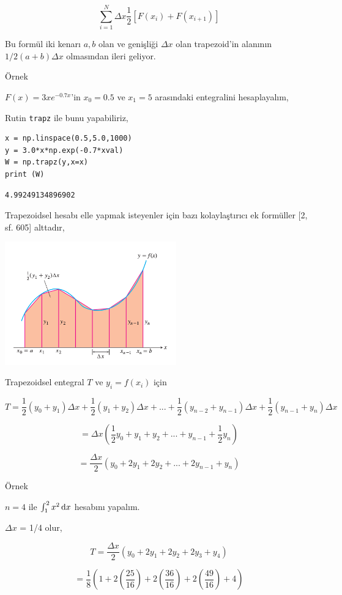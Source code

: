 \documentclass[12pt,fleqn]{article}\usepackage{../../common}
\begin{document}
$$
\sum_{i=1}^{N} \Delta x \frac{1}{2} [F(x_i) + F(x_{i+1})]
$$

Bu formül iki kenarı $a,b$ olan ve genişliği $\Delta x$ olan trapezoid'in
alanının $1/2(a+b)\Delta x$ olmasından ileri geliyor.

Örnek

$F(x) = 3 x e^{-0.7 x}$'in $x_0=0.5$ ve $x_1=5$ arasındaki entegralini
hesaplayalım,

Rutin \verb!trapz! ile bunu yapabiliriz,

\begin{verbatim}
x = np.linspace(0.5,5.0,1000)
y = 3.0*x*np.exp(-0.7*xval)
W = np.trapz(y,x=x)
print (W)
\end{verbatim}

\begin{verbatim}
4.99249134896902
\end{verbatim}

Trapezoidsel hesabı elle yapmak isteyenler için bazı kolaylaştırıcı ek
formüller [2, sf. 605] alttadır,

\includegraphics[width=20em]{compscieng_app01numint_02.png}

Trapezoidsel entegral $T$ ve $y_i = f(x_i)$ için 

$$
T = \frac{1}{2} (y_0 + y_1)\Delta x + \frac{1}{2} (y_1 + y_2)\Delta x +... +
\frac{1}{2} (y_{n-2} + y_{n-1})\Delta x + \frac{1}{2} (y_{n-1} + y_n)\Delta x
$$

$$
= \Delta x (\frac{1}{2}y_0 + y_1 + y_2 + ... + y_{n-1} + \frac{1}{2} y_n )
$$

$$
= \frac{\Delta x}{2} (y_0 + 2y_1 + 2y_2 + ... + 2y_{n-1} + y_n)
$$

Örnek

$n=4$ ile  $\int_{1}^{2} x^2 \,\mathrm{d} x$ hesabını yapalım. 

$\Delta x$ = 1/4 olur,

$$
T = \frac{\Delta x}{2} (y_0 + 2y_1 + 2y_2 + 2y_3 + y_4)
$$

$$
= \frac{1}{8} (1 + 2 (\frac{25}{16}) + 2(\frac{36}{16}) + 2 (\frac{49}{16}) + 4)
$$
\end{document}
